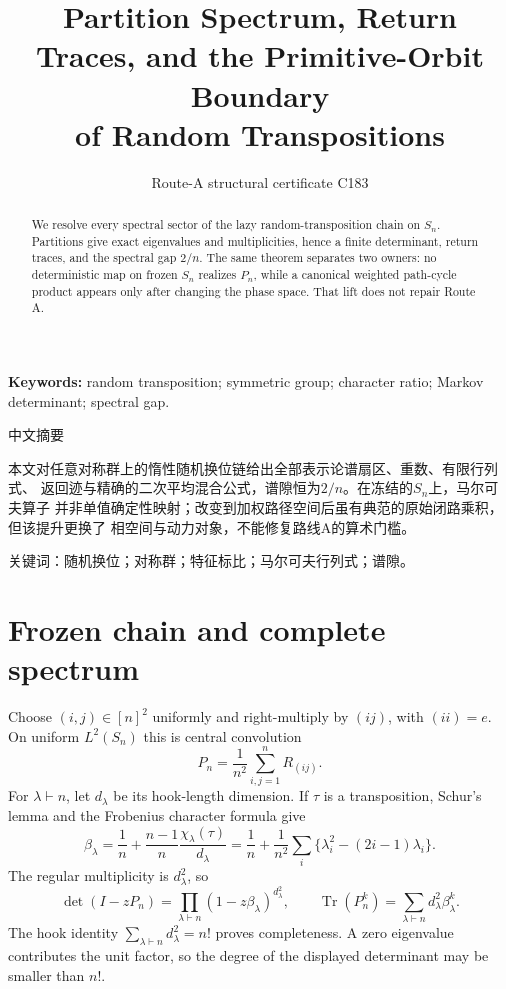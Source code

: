 \documentclass[9pt]{extarticle}
\title{Partition Spectrum, Return Traces, and the Primitive-Orbit Boundary\\
of Random Transpositions}
\author{Route-A structural certificate C183}
\date{}
\begin{document}
\maketitle
\begin{abstract}
We resolve every spectral sector of the lazy random-transposition chain on
$S_n$.  Partitions give exact eigenvalues and multiplicities, hence a finite
determinant, return traces, and the spectral gap $2/n$.  The same theorem
separates two owners: no deterministic map on frozen $S_n$ realizes $P_n$,
while a canonical weighted path-cycle product appears only after changing
the phase space.  That lift does not repair Route A.
\end{abstract}
\noindent\textbf{Keywords:} random transposition; symmetric group; character
ratio; Markov determinant; spectral gap.

\begin{otherlanguage}{chinese-simplified}
\begin{center}{\large 中文摘要}\end{center}
本文对任意对称群上的惰性随机换位链给出全部表示论谱扇区、重数、有限行列式、
返回迹与精确的二次平均混合公式，谱隙恒为$2/n$。在冻结的$S_n$上，马尔可夫算子
并非单值确定性映射；改变到加权路径空间后虽有典范的原始闭路乘积，但该提升更换了
相空间与动力对象，不能修复路线\foreignlanguage{english}{A}的算术门槛。

\noindent 关键词：随机换位；对称群；特征标比；马尔可夫行列式；谱隙。
\end{otherlanguage}

\section{Frozen chain and complete spectrum}
Choose $(i,j)\in[n]^2$ uniformly and right-multiply by $(ij)$, with
$(ii)=e$.  On uniform $L^2(S_n)$ this is central convolution
\[
 P_n=\frac1{n^2}\sum_{i,j=1}^nR_{(ij)}.
\]
For $\lambda\vdash n$, let $d_\lambda$ be its hook-length dimension.  If
$\tau$ is a transposition, Schur's lemma and the Frobenius character formula
give
\[
 \beta_\lambda=\frac1n+\frac{n-1}{n}
 \frac{\chi_\lambda(\tau)}{d_\lambda}
 =\frac1n+\frac1{n^2}\sum_i
 \{\lambda_i^2-(2i-1)\lambda_i\}.
\]
The regular multiplicity is $d_\lambda^2$, so
\[
 \det(I-zP_n)=\prod_{\lambda\vdash n}
 (1-z\beta_\lambda)^{d_\lambda^2},\qquad
 \operatorname{Tr}(P_n^k)=\sum_{\lambda\vdash n}
 d_\lambda^2\beta_\lambda^k.
\]
The hook identity $\sum_{\lambda\vdash n}d_\lambda^2=n!$ proves
completeness.  A zero eigenvalue contributes the unit factor, so the degree
of the displayed determinant may be smaller than $n!$.
\end{document}
